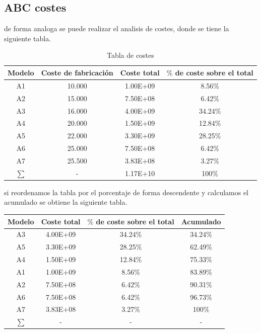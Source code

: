 \documentclass{report}
\begin{document}
\begin{raggedright}
\subsection{ABC costes}
de forma analoga se puede realizar el analisis de costes, donde se tiene la siguiente tabla.\\
\begin{table}[h]
	\centering
	\begin{tabular}{cccc}
		\toprule
		\textbf{Modelo} & \textbf{Coste de fabricación} & \textbf{Coste total} & \textbf{$\%$ de coste sobre el total} \\
		\midrule
		A1 & 10.000 & 1.00E+09 & 8.56$\%$ \\
		A2 & 15.000 & 7.50E+08 & 6.42$\%$ \\
		A3 & 16.000 & 4.00E+09 & 34.24$\%$ \\
		A4 & 20.000 & 1.50E+09 & 12.84$\%$ \\
		A5 & 22.000 & 3.30E+09 & 28.25$\%$ \\
		A6 & 25.000 & 7.50E+08 & 6.42$\%$ \\
		A7 & 25.500 & 3.83E+08 & 3.27$\%$ \\
		\midrule
		$\sum$ & - & 1.17E+10 &100$\%$\\
		\bottomrule
	\end{tabular}
	\caption{Tabla de costes}
\end{table}
si reordenamos la tabla por el porcentaje de forma descendente y calculamos el acumulado se obtiene la siguiente tabla.\\
\begin{table}[h]
	\centering
	\begin{tabular}{cccc}
		\toprule
		\textbf{Modelo} & \textbf{Coste total} & \textbf{$\%$ de coste sobre el total} & \textbf{Acumulado} \\
		\midrule
		A3 & 4.00E+09 & 34.24$\%$ & 34.24$\%$ \\
		A5 & 3.30E+09 & 28.25$\%$ & 62.49$\%$ \\
		A4 & 1.50E+09 & 12.84$\%$ & 75.33$\%$ \\
		A1 & 1.00E+09 & 8.56$\%$ & 83.89$\%$ \\
		A2 & 7.50E+08 & 6.42$\%$ & 90.31$\%$ \\
		A6 & 7.50E+08 & 6.42$\%$&96.73$\%$\\
		A7 & 3.83E+08 & 3.27$\%$&100$\%$\\
		\midrule
		$\sum$ & - & -& -\\

\end{tabular}
\end{table}
\end{raggedright}
\end{document}
